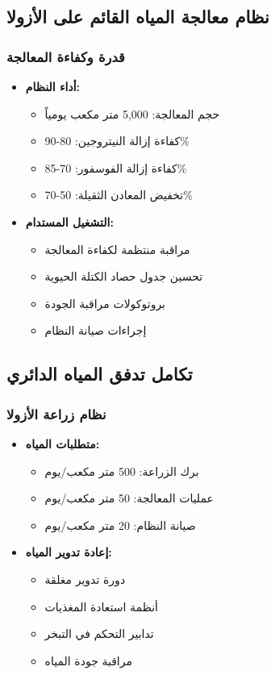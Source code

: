 \subsection{نظام معالجة المياه القائم على الأزولا}

\subsubsection{قدرة وكفاءة المعالجة}
\begin{itemize}
    \item \textbf{أداء النظام:}
    \begin{itemize}
        \item حجم المعالجة: 5,000 متر مكعب يومياً
        \item كفاءة إزالة النيتروجين: 80-90\%
        \item كفاءة إزالة الفوسفور: 70-85\%
        \item تخفيض المعادن الثقيلة: 50-70\%
    \end{itemize}
    
    \item \textbf{التشغيل المستدام:}
    \begin{itemize}
        \item مراقبة منتظمة لكفاءة المعالجة
        \item تحسين جدول حصاد الكتلة الحيوية
        \item بروتوكولات مراقبة الجودة
        \item إجراءات صيانة النظام
    \end{itemize}
\end{itemize}

\subsection{تكامل تدفق المياه الدائري}

\subsubsection{نظام زراعة الأزولا}
\begin{itemize}
    \item \textbf{متطلبات المياه:}
    \begin{itemize}
        \item برك الزراعة: 500 متر مكعب/يوم
        \item عمليات المعالجة: 50 متر مكعب/يوم
        \item صيانة النظام: 20 متر مكعب/يوم
    \end{itemize}
    
    \item \textbf{إعادة تدوير المياه:}
    \begin{itemize}
        \item دورة تدوير مغلقة
        \item أنظمة استعادة المغذيات
        \item تدابير التحكم في التبخر
        \item مراقبة جودة المياه
    \end{itemize}
\end{itemize}


